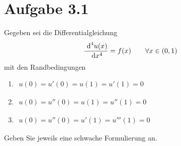 \documentclass[12pt,a4paper]{article}
\author{Willi Sontopski}
\begin{document}

\section*{Aufgabe 3.1}
Gegeben sei die Differentialgleichung 
\begin{align*}
\frac{\text{ d}^4 u(x)}{\text{ d} x^4}=f(x)\qquad\forall x\in(0,1)
\end{align*}
mit den Randbedingungen
\begin{enumerate}[label=(\alph*)]
\item $\begin{aligned}
u(0)=u'(0)=u(1)=u'(1)=0
\end{aligned}$
\item $\begin{aligned}
u(0)=u''(0)=u(1)=u''(1)=0
\end{aligned}$
\item $\begin{aligned}
u(0)=u''(0)=u'(1)=u'''(1)=0
\end{aligned}$
\end{enumerate}
Geben Sie jeweils eine schwache Formulierung an.
\end{document}
